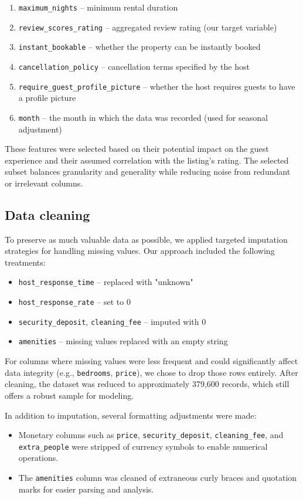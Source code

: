 \begin{enumerate}
    \item \texttt{maximum\_nights} – minimum rental duration
    \item \texttt{review\_scores\_rating} – aggregated review rating (our target variable)
    \item \texttt{instant\_bookable} – whether the property can be instantly booked
    \item \texttt{cancellation\_policy} – cancellation terms specified by the host
    \item \texttt{require\_guest\_profile\_picture} – whether the host requires guests to have a profile picture
    \item \texttt{month} – the month in which the data was recorded (used for seasonal adjustment)
\end{enumerate}

These features were selected based on their potential impact on the guest experience and their assumed correlation with the listing's rating. The selected subset balances granularity and generality while reducing noise from redundant or irrelevant columns.

\subsection{Data cleaning }
\label{sec:dataCleaning}
To preserve as much valuable data as possible, we applied targeted imputation strategies for handling missing values. Our approach included the following treatments:

\begin{itemize}
    \item \texttt{host\_response\_time} – replaced with "unknown"
    \item \texttt{host\_response\_rate} – set to 0
    \item \texttt{security\_deposit}, \texttt{cleaning\_fee} – imputed with 0
    \item \texttt{amenities} – missing values replaced with an empty string
\end{itemize}

For columns where missing values were less frequent and could significantly affect data integrity (e.g., \texttt{bedrooms}, \texttt{price}), we chose to drop those rows entirely. After cleaning, the dataset was reduced to approximately 379,600 records, which still offers a robust sample for modeling.

In addition to imputation, several formatting adjustments were made:
\begin{itemize}
    \item Monetary columns such as \texttt{price}, \texttt{security\_deposit}, \texttt{cleaning\_fee}, and \texttt{extra\_people} were stripped of currency symbols to enable numerical operations.
    \item The \texttt{amenities} column was cleaned of extraneous curly braces and quotation marks for easier parsing and analysis.
\end{itemize}

